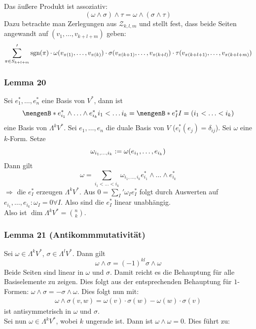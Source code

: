 Das äußere Produkt ist assoziativ:
\[
	(\omega \wedge \sigma) \wedge \tau = \omega \wedge (\sigma \wedge \tau)
\]
Dazu betrachte man Zerlegungen aus $\mathcal{Z}_{k,l,m}$ und stellt fest, dass beide Seiten angewandt auf $(v_1, \ldots , v_{k+l+m})$ geben:
\[
	\sum_{\pi \in S_{k+l+m}}' \operatorname{sgn}(\pi) \cdot \omega(v_{\pi(1)}, \ldots , v_{\pi(k)}) \cdot \sigma(v_{\pi(k+1)}, \ldots , v_{\pi(k+l)}) \cdot \tau(v_{\pi(k+l+1)}, \ldots , 
	v_{\pi(k+l+m)})
\]

\subsubsection[Lemma 20: Basis des Vektorraumes $\Lambda^k V^*$]{Lemma 20} %
\label{ssub:513}
Sei $e_1^*, \ldots , e_n^*$ eine Basis von $V^*$, dann ist 
\[
	\set[e_{i_1}^* \wedge \ldots \wedge e_{i_k}^*]{i_1 < \ldots i_k} = \set[e_I^*]{I=(i_1 < \ldots < i_k)}  
\]
eine Basis von $\Lambda^k V^*$.
Sei $e_1, \ldots , e_n$ die duale Basis von $V$ ($e_i^*(e_j)= \delta_{ij}$). Sei $\omega$ eine $k$-Form. Setze 
\[
	\omega_{i_1, \ldots , i_k} := \omega \enbrace*{e_{i_1}, \ldots , e_{i_k}} 
\]
Dann gilt
\[
	\omega = \sum_{i_1 < \ldots  < i_k} \omega_{i_1, \ldots , i_k} e_{i_1}^* \wedge \ldots \wedge e_{i_k}^*
\]
$\Rightarrow $ die $e_I^*$ erzeugen $\Lambda^k V^*$. Aus $0= \sum_I' \omega_I e_I^*$ folgt durch Auswerten auf $e_{i_1}, \ldots , e_{i_k} : \omega_I = 0 \forall I$.
Also sind die $e_I^*$ linear unabhängig. \bewende \medskip \\
Also ist $\dim \Lambda^k V^* = \binom{n}{k}$.

\subsubsection{Lemma 21 (Antikommmutativität)} %
\label{ssub:514}
Sei $\omega \in \Lambda^k V^*$, $\sigma \in \Lambda^l V^*$. Dann gilt
\[
	\omega \wedge \sigma = (-1)^{kl} \sigma \wedge \omega
\]
Beide Seiten sind linear in $\omega$ und $\sigma$. Damit reicht es die Behauptung für alle Basiselemente zu zeigen. Dies folgt aus der entsprechenden Behauptung für 
$1$-Formen: $\omega \wedge \sigma = - \sigma \wedge \omega$. Dies folgt nun mit:
\begin{align*}
	\omega \wedge \sigma(v,w) = \omega(v) \cdot \sigma(w) - \omega(w) \cdot \sigma(v)
\end{align*}
ist antisymmetrisch in $\omega$ und $\sigma$. \bewende \medskip \\
Sei nun $\omega \in \Lambda^k V^*$, wobei $k$ ungerade ist. Dann ist $\omega \wedge \omega = 0$. Dies führt zu:

